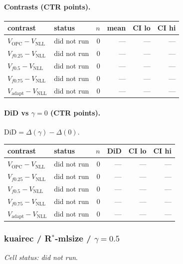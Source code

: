 \documentclass[10pt,a4paper]{article}
\begin{document}
\paragraph{Contrasts (CTR points).}
{\centering\small\begin{tabular}{llrrrr}
\toprule contrast & status & $n$ & mean & CI lo & CI hi \\
\midrule
$V_{\mathrm{OPC}}-V_{\mathrm{NLL}}$ & did not run & 0 & --- & --- & --- \\
$V_{f0.25}-V_{\mathrm{NLL}}$ & did not run & 0 & --- & --- & --- \\
$V_{f0.5}-V_{\mathrm{NLL}}$ & did not run & 0 & --- & --- & --- \\
$V_{f0.75}-V_{\mathrm{NLL}}$ & did not run & 0 & --- & --- & --- \\
$V_{\mathrm{adapt}}-V_{\mathrm{NLL}}$ & did not run & 0 & --- & --- & --- \\
\bottomrule\end{tabular}\par}
\paragraph{DiD vs $\gamma=0$ (CTR points).} $\mathrm{DiD}=\Delta(\gamma)-\Delta(0)$.
{\centering\small\begin{tabular}{llrrrr}
\toprule contrast & status & $n$ & DiD & CI lo & CI hi \\
\midrule
$V_{\mathrm{OPC}}-V_{\mathrm{NLL}}$ & did not run & 0 & --- & --- & --- \\
$V_{f0.25}-V_{\mathrm{NLL}}$ & did not run & 0 & --- & --- & --- \\
$V_{f0.5}-V_{\mathrm{NLL}}$ & did not run & 0 & --- & --- & --- \\
$V_{f0.75}-V_{\mathrm{NLL}}$ & did not run & 0 & --- & --- & --- \\
$V_{\mathrm{adapt}}-V_{\mathrm{NLL}}$ & did not run & 0 & --- & --- & --- \\
\bottomrule\end{tabular}\par}
\bigskip
\subsubsection{kuairec / R$^*$-mlsize / $\gamma=0.5$}
\emph{Cell status: did not run}.
\end{document}
